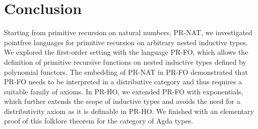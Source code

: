 \documentclass[a4paper,USenglish,cleveref, autoref, thm-restate]{lipics-v2021}
\begin{document}
\section{Conclusion}
\label{sec:conclusion}

Starting from primitive recursion on natural numbers, PR-NAT, we
investigated pointfree languages for primitive recursion on arbitrary
nested inductive types. We explored the first-order setting with the
language PR-FO, which allows the definition of primitive recursive
functions on nested inductive types defined by polynomial
functors. The embedding of PR-NAT in PR-FO demonstrated that PR-FO
needs to be interpreted in a distributive category and thus requires a
suitable family of axioms. In PR-HO, we extended PR-FO with
exponentials, which further extends the scope of inductive types and
avoids the need for a distributivity axiom as it is definable in
PR-HO. We finished with an elementary proof of this folklore theorem
for the category of Agda types.




\end{document}
